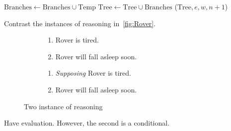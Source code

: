 \begin{algorithm}[H]
{{{          \(\text{Branches} \longleftarrow \text{Branches} \cup \text{Temp}\)\;
          \label{PrAl:dev-tree:Stops:cond:else:futureB:loop:gather}
        }
        \label{PrAl:dev-tree:Stops:cond:else:futureB:end}
        {
          \(\text{Tree} \longleftarrow \text{Tree} \cup \text{Branches}\)\;
          \label{PrAl:dev-tree:Stops:cond:else:futureB:process:expand}
          \AlgDevelopTree{}(\(\text{Tree}, e,w, n+1\))\;
          \label{PrAl:dev-tree:Stops:cond:else:futureB:process:end}
        }
        \label{PrAl:dev-tree:Stops:cond:else:end}
      }
      \label{PrAl:dev-tree:Stops:cond:end}
    }
  \end{algorithm}

  Contrast the instances of reasoning in~\autoref{fig:Rover}.
  \begin{figure}[h!]
    \mbox{}\hfill
    \begin{subfigure}{0.45\linewidth}
      \begin{enumerate}[label=\arabic*.,ref=(\arabic*)]
      \item
        \label{fig:Rover:CS:1}
        Rover is tired.
      \item
        \label{fig:Rover:CS:2}
        Rover will fall asleep soon.
      \end{enumerate}
      \caption{}
      \label{fig:Rover:CS}
    \end{subfigure}
    \hfill
    \begin{subfigure}{0.45\linewidth}
      \begin{enumerate}[label=\arabic*\('\).,ref=(\arabic*\('\))]
      \item
        \label{fig:Rover:nCS:1}
        \emph{Supposing} Rover is tired.
      \item
        \label{fig:Rover:nCS:2}
        Rover will fall asleep soon.
      \end{enumerate}
      \caption{}
      \label{fig:Rover:nCS}
    \end{subfigure}
    \hfill\mbox{}
    \caption{Two instance of reasoning}
    \label{fig:Rover}
  \end{figure}
  Have evaluation.
  However, the second is a conditional.


